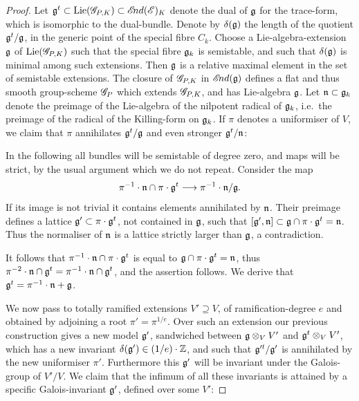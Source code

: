 \documentclass[12pt,english]{smfart}
\theoremstyle{plain} \newtheorem{innerthm}{Theorem} \newtheorem{innerlem}{Lemma} \newtheorem{innerprop}{Proposition} \newtheorem{innercor}{Corollary} \theoremstyle{definition} \newtheorem{innerdefn}{Definition} \newtheorem{innerconstr}{Construction} \theoremstyle{remark} \newtheorem*{remark}{Remark} \newtheorem*{remarks}{Remarks} \newtheorem*{applications}{Applications}
\begin{document}
\begin{proof}
Let $\mathfrak{g}^t\subset\operatorname{Lie}(\mathscr{G}_{P,K})\subset\mathscr{E}\!nd(\mathscr{E})_K$ denote the dual of $\mathfrak{g}$ for the trace-form, which is isomorphic to the dual-bundle. Denote by $\delta(\mathfrak{g})$ the length of the quotient $\mathfrak{g}^t/\mathfrak{g}$, in the generic point of the special fibre $C_k$. Choose a Lie-algebra-extension $\mathfrak{g}$ of $\operatorname{Lie}(\mathscr{G}_{P,K})$ such that the special fibre $\mathfrak{g}_k$ is semistable, and such that $\delta(\mathfrak{g})$ is minimal among such extensions. Then $\mathfrak{g}$ is a relative maximal element in the set of semistable extensions. The closure of $\mathscr{G}_{P,K}$ in $\mathscr{E}\!nd(\mathfrak{g})$ defines a flat and thus smooth group-scheme $\mathscr{G}_P$ which extends $\mathscr{G}_{P,K}$, and has Lie-algebra $\mathfrak{g}$. Let $\mathfrak{n}\subset\mathfrak{g}_k$ denote the preimage of the Lie-algebra of the nilpotent radical of $\mathfrak{g}_k$, i.e.\ the preimage of the radical of the Killing-form on $\mathfrak{g}_k$. If $\pi$ denotes a uniformiser of $V$, we claim that $\pi$ annihilates $\mathfrak{g}^t/\mathfrak{g}$ and even stronger $\mathfrak{g}^t/\mathfrak{n}$:

In the following all bundles will be semistable of degree zero, and maps will be strict, by the usual argument which we do not repeat. Consider the map
\[
\pi^{-1}\cdot\mathfrak{n}\cap\pi\cdot\mathfrak{g}^t\longrightarrow \pi^{-1}\cdot\mathfrak{n}/\mathfrak{g} .
\]
If its image is not trivial it contains elements annihilated by $\mathfrak{n}$. Their preimage defines a lattice $\mathfrak{g}'\subset\pi\cdot\mathfrak{g}^t$, not contained in $\mathfrak{g}$, such that $[\mathfrak{g}',\mathfrak{n}]\subset\mathfrak{g}\cap\pi\cdot\mathfrak{g}^t=\mathfrak{n}$. Thus the normaliser of $\mathfrak{n}$ is a lattice strictly larger than $\mathfrak{g}$, a contradiction.

It follows that $\pi^{-1}\cdot\mathfrak{n}\cap\pi\cdot\mathfrak{g}^t$ is equal to $\mathfrak{g}\cap\pi\cdot\mathfrak{g}^t=\mathfrak{n}$, thus $\pi^{-2}\cdot\mathfrak{n}\cap\mathfrak{g}^t=\pi^{-1}\cdot\mathfrak{n}\cap\mathfrak{g}^t$, and the assertion follows. We derive that $\mathfrak{g}^t=\pi^{-1}\cdot\mathfrak{n}+\mathfrak{g}$.

We now pass to totally ramified extensions $V'\supseteq V$, of ramification-degree $e$ and obtained by adjoining a root $\pi'=\pi^{1/e}$. Over such an extension our previous construction gives a new model $\mathfrak{g}'$, sandwiched between $\mathfrak{g}\otimes_V V'$ and $\mathfrak{g}^t\otimes_V V'$, which has a new invariant $\delta(\mathfrak{g}')\in(1/e)\cdot\mathbb{Z}$, and such that $\mathfrak{g}'^t/\mathfrak{g}'$ is annihilated by the new uniformiser $\pi'$. Furthermore this $\mathfrak{g}'$ will be invariant under the Galois-group of $V'/V$. We claim that the infimum of all these invariants is attained by a specific Galois-invariant $\mathfrak{g}'$, defined over some $V'$:


\end{proof}
\end{document}
